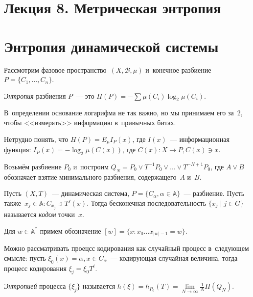 \documentclass{article}
\begin{document}
\section*{Лекция 8. Метрическая энтропия}
\resetcntrs

\section{Энтропия динамической системы}

Рассмотрим фазовое пространство~$(X, \mathcal{B}, \mu)$ и~конечное разбиение
$P = \{C_1, \ldots, C_n\}$.

\begin{definition}
	\emph{Энтропия} разбиения $P$~--- это $H(P) = -\sum \mu(C_i) \log_2 \mu(C_i)$.
\end{definition}

\begin{remark}
	В~определении основание логарифма не так важно, но мы принимаем его за~2,
	чтобы <<измерять>> информацию в~привычных битах.

	Нетрудно понять, что $H(P) = E_\mu I_P(x)$, где $I(x)$~--- информационная
	функция: $I_P(x) = -\log_2 \mu(C(x))$, где $C(x): X \rightarrow P, C(x) \ni
	x$.
\end{remark}

Возьмём разбиение $P_0$ и~построим $Q_N = P_0 \lor T^{-1} P_0 \lor \ldots \lor
T^{-N + 1} P_0$, где $A \lor B$ обозначает взятие минимального разбиения,
содержащего~$A$ и~$B$.

\begin{definition}
	Пусть $(X, T)$~--- динамическая система, $P = \{C_\alpha, \alpha \in
	\mathbb{A}\}$~--- разбиение. Пусть также~$x_j \in \mathbb{A}: C_{x_j} \ni
	T^j(x)$. Тогда бесконечная последовательность $\{x_j \mid j \in G\}$
	называется \emph{кодом} точки~$x$.
\end{definition}

Для $w \in \mathbb{A}^\ast$ примем обозначение $[w] = \{x: x_0 \ldots x_{|w|-1}
= w\}$.

Можно рассматривать проецсс кодирования как случайный процесс
в~следующем смысле: пусть $\xi_0(x) = \alpha, x \in C_\alpha$~--- кодирующая
случайная величина, тогда процесс кодирования $\xi_j = \xi_0 T^i$.

\begin{definition}
	\emph{Энтропией} процесса $\{\xi_j\}$ называется $h(\xi) = h_{P_0}(T) =
	\lim\limits_{N \rightarrow \infty} \frac{1}{N} H(Q_N)$.
\end{definition}
\end{document}

